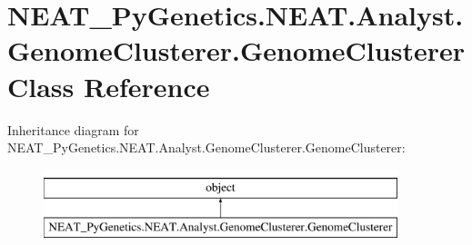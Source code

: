 \hypertarget{class_n_e_a_t___py_genetics_1_1_n_e_a_t_1_1_analyst_1_1_genome_clusterer_1_1_genome_clusterer}{}\section{N\+E\+A\+T\+\_\+\+Py\+Genetics.\+N\+E\+A\+T.\+Analyst.\+Genome\+Clusterer.\+Genome\+Clusterer Class Reference}
\label{class_n_e_a_t___py_genetics_1_1_n_e_a_t_1_1_analyst_1_1_genome_clusterer_1_1_genome_clusterer}
Inheritance diagram for N\+E\+A\+T\+\_\+\+Py\+Genetics.\+N\+E\+A\+T.\+Analyst.\+Genome\+Clusterer.\+Genome\+Clusterer\+:\begin{figure}[H]
\begin{center}
\leavevmode
\includegraphics[height=2.000000cm]{class_n_e_a_t___py_genetics_1_1_n_e_a_t_1_1_analyst_1_1_genome_clusterer_1_1_genome_clusterer}
\end{center}
\end{figure}
